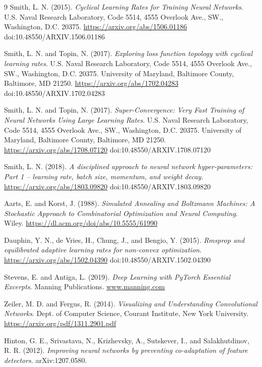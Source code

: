 \begin{thebibliography}{9}
Smith, L. N. (2015).
\textit{Cyclical Learning Rates for Training Neural Networks}.
U.S. Naval Research Laboratory, Code 5514, 4555 Overlook Ave., SW., Washington, D.C. 20375.
\url{https://arxiv.org/abs/1506.01186}
doi:10.48550/ARXIV.1506.01186

Smith, L. N. and Topin, N. (2017).
\textit{Exploring loss function topology with cyclical learning rates}.
U.S. Naval Research Laboratory, Code 5514, 4555 Overlook Ave., SW., Washington, D.C. 20375. University of Maryland, Baltimore County, Baltimore, MD 21250.
\url{https://arxiv.org/abs/1702.04283}
doi:10.48550/ARXIV.1702.04283

Smith, L. N. and Topin, N. (2017).
\textit{Super-Convergence: Very Fast Training of Neural Networks Using Large Learning Rates}.
U.S. Naval Research Laboratory, Code 5514, 4555 Overlook Ave., SW., Washington, D.C. 20375. University of Maryland, Baltimore County, Baltimore, MD 21250.
\url{https://arxiv.org/abs/1708.07120}
doi:10.48550/ARXIV.1708.07120

Smith, L. N. (2018).
\textit{A disciplined approach to neural network hyper-parameters: Part 1 -- learning rate, batch size, momentum, and weight decay}.
\url{https://arxiv.org/abs/1803.09820}
doi:10.48550/ARXIV.1803.09820

Aarts, E. and Korst, J. (1988).
\textit{Simulated Annealing and Boltzmann Machines: A Stochastic Approach to Combinatorial Optimization and Neural Computing}.
Wiley.
\url{https://dl.acm.org/doi/abs/10.5555/61990}

Dauphin, Y. N., de Vries, H., Chung, J., and Bengio, Y. (2015).
\textit{Rmsprop and equilibrated adaptive learning rates for non-convex optimization}.
\url{https://arxiv.org/abs/1502.04390}
doi:10.48550/ARXIV.1502.04390

Stevens, E. and Antiga, L. (2019).
\textit{Deep Learning with PyTorch Essential Excerpts}.
Manning Publications.
\url{www.manning.com}

Zeiler, M. D. and Fergus, R. (2014).
\textit{Visualizing and Understanding Convolutional Networks}.
Dept. of Computer Science, Courant Institute, New York University.
\url{https://arxiv.org/pdf/1311.2901.pdf}

Hinton, G. E., Srivastava, N., Krizhevsky, A., Sutskever, I., and Salakhutdinov, R. R. (2012).
\textit{Improving neural networks by preventing co-adaptation of feature detectors}.
arXiv:1207.0580.


\end{thebibliography}
